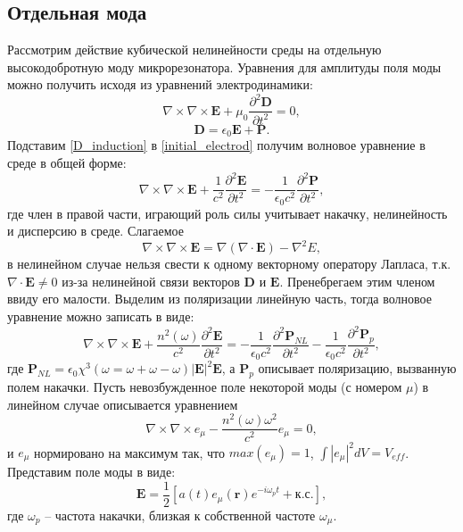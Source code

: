 \subsection{Отдельная мода}
Рассмотрим действие кубической нелинейности среды на отдельную высокодобротную моду микрорезонатора. Уравнения для амплитуды поля моды можно получить исходя из уравнений электродинамики:
\begin{equation}\label{initial_electrod}
\nabla\times\nabla\times\textbf{E}+\mu_0\frac{\partial^2\textbf{D}}{\partial t^2}=0,
\end{equation}
\begin{equation}\label{D_induction}
\textbf{D}=\epsilon_0\textbf{E}+\textbf{P}.
\end{equation}
Подставим \eqref{D_induction} в \eqref{initial_electrod} получим волновое уравнение в среде в общей форме:
\begin{equation}
\nabla\times\nabla\times\textbf{E}+\frac{1}{c^2}\frac{\partial^2\textbf{E}}{\partial t^2}=-\frac{1}{\epsilon_0c^2}\frac{\partial^2\textbf{P}}{\partial t^2},
\end{equation}
где член в правой части, играющий роль силы учитывает накачку, нелинейность и дисперсию в среде.
Слагаемое
\begin{equation}
\nabla\times\nabla\times\textbf{E}=\nabla(\nabla\cdot \textbf{E})-\nabla^2E,
\end{equation}
в нелинейном случае нельзя свести к одному векторному оператору Лапласа, т.к. $\nabla\cdot\textbf{E}\neq0$ из-за нелинейной связи векторов $\textbf{D}$ и $\textbf{E}$. Пренебрегаем этим членом ввиду его малости. Выделим из поляризации линейную часть, тогда волновое уравнение можно записать в виде:
\begin{equation}\label{wave_eq_polarization}
\nabla\times\nabla\times\textbf{E}+\frac{n^2(\omega)}{c^2}\frac{\partial^2\textbf{E}}{\partial t^2} =-\frac{1}{\epsilon_0c^2}\frac{\partial^2\textbf{P}_{NL}}{\partial t^2}-\frac{1}{\epsilon_0c^2}\frac{\partial^2\textbf{P}_{p}}{\partial t^2},
\end{equation}
где $\textbf{P}_{NL}=\epsilon_0\chi^3(\omega=\omega+\omega-\omega)|\textbf{E}|^2\textbf{E}$, а $\textbf{P}_p$ описывает поляризацию, вызванную полем накачки.
Пусть невозбужденное поле некоторой моды (с номером $\mu$) в линейном случае описывается уравнением
\begin{equation}\label{Helmholz}
\nabla\times\nabla\times\textbf{$e_\mu$}-\frac{n^2(\omega)\omega^2}{c^2}\textbf{$e_\mu$}=0,
\end{equation}
и $e_\mu$ нормировано на максимум так, что $max(e_\mu)=1$, $\int|e_\mu|^2dV=V_{eff}$. Представим поле моды в виде:
\begin{equation}
\textbf{E}=\frac{1}{2}[a(t)\textbf{$e_\mu$}(\textbf{r})e^{-i\omega_pt}+\text{к.с.}],
\end{equation}
где $\omega_p$ -- частота накачки, близкая к собственной частоте $\omega_\mu$.

